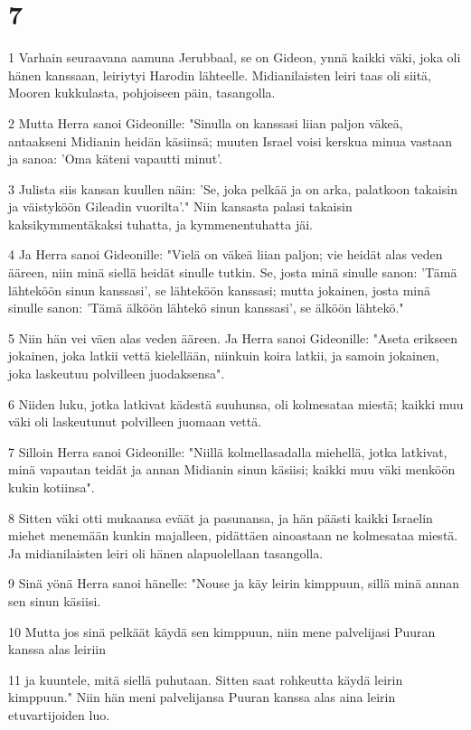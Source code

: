 \chapter{7}

\par 1 Varhain seuraavana aamuna Jerubbaal, se on Gideon, ynnä kaikki väki, joka oli hänen kanssaan, leiriytyi Harodin lähteelle. Midianilaisten leiri taas oli siitä, Mooren kukkulasta, pohjoiseen päin, tasangolla.
\par 2 Mutta Herra sanoi Gideonille: "Sinulla on kanssasi liian paljon väkeä, antaakseni Midianin heidän käsiinsä; muuten Israel voisi kerskua minua vastaan ja sanoa: 'Oma käteni vapautti minut'.
\par 3 Julista siis kansan kuullen näin: 'Se, joka pelkää ja on arka, palatkoon takaisin ja väistyköön Gileadin vuorilta'." Niin kansasta palasi takaisin kaksikymmentäkaksi tuhatta, ja kymmenentuhatta jäi.
\par 4 Ja Herra sanoi Gideonille: "Vielä on väkeä liian paljon; vie heidät alas veden ääreen, niin minä siellä heidät sinulle tutkin. Se, josta minä sinulle sanon: 'Tämä lähteköön sinun kanssasi', se lähteköön kanssasi; mutta jokainen, josta minä sinulle sanon: 'Tämä älköön lähtekö sinun kanssasi', se älköön lähtekö."
\par 5 Niin hän vei väen alas veden ääreen. Ja Herra sanoi Gideonille: "Aseta erikseen jokainen, joka latkii vettä kielellään, niinkuin koira latkii, ja samoin jokainen, joka laskeutuu polvilleen juodaksensa".
\par 6 Niiden luku, jotka latkivat kädestä suuhunsa, oli kolmesataa miestä; kaikki muu väki oli laskeutunut polvilleen juomaan vettä.
\par 7 Silloin Herra sanoi Gideonille: "Niillä kolmellasadalla miehellä, jotka latkivat, minä vapautan teidät ja annan Midianin sinun käsiisi; kaikki muu väki menköön kukin kotiinsa".
\par 8 Sitten väki otti mukaansa eväät ja pasunansa, ja hän päästi kaikki Israelin miehet menemään kunkin majalleen, pidättäen ainoastaan ne kolmesataa miestä. Ja midianilaisten leiri oli hänen alapuolellaan tasangolla.
\par 9 Sinä yönä Herra sanoi hänelle: "Nouse ja käy leirin kimppuun, sillä minä annan sen sinun käsiisi.
\par 10 Mutta jos sinä pelkäät käydä sen kimppuun, niin mene palvelijasi Puuran kanssa alas leiriin
\par 11 ja kuuntele, mitä siellä puhutaan. Sitten saat rohkeutta käydä leirin kimppuun." Niin hän meni palvelijansa Puuran kanssa alas aina leirin etuvartijoiden luo.
